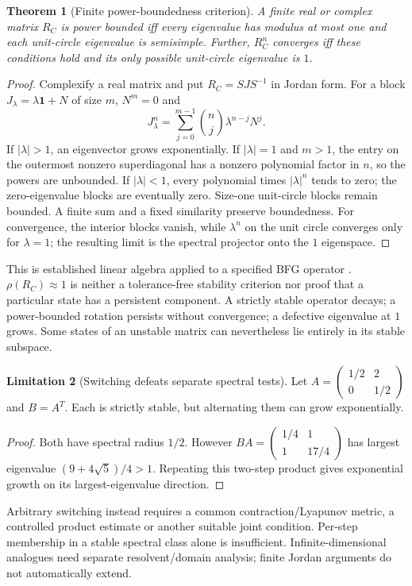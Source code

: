 \documentclass[11pt,letterpaper]{article}
\newcommand{\Id}{\mathbf 1}
\newtheorem{theorem}{Theorem}[section]
\theoremstyle{definition}
\newtheorem{limitation}[theorem]{Limitation}
\numberwithin{equation}{section}
\begin{document}
\begin{theorem}[Finite power-boundedness criterion]\label{spectral}
A finite real or complex matrix $R_C$ is power bounded iff every eigenvalue has modulus at most one and each unit-circle eigenvalue is semisimple. Further, $R_C^n$ converges iff these conditions hold and its only possible unit-circle eigenvalue is $1$.
\end{theorem}
\begin{proof}
Complexify a real matrix and put $R_C=SJS^{-1}$ in Jordan form. For a block $J_\lambda=\lambda\Id+N$ of size $m$, $N^m=0$ and
\begin{equation}
J_\lambda^n=\sum_{j=0}^{m-1}\binom nj\lambda^{n-j}N^j.
\end{equation}
If $|\lambda|>1$, an eigenvector grows exponentially. If $|\lambda|=1$ and $m>1$, the entry on the outermost nonzero superdiagonal has a nonzero polynomial factor in $n$, so the powers are unbounded. If $|\lambda|<1$, every polynomial times $|\lambda|^n$ tends to zero; the zero-eigenvalue blocks are eventually zero. Size-one unit-circle blocks remain bounded. A finite sum and a fixed similarity preserve boundedness. For convergence, the interior blocks vanish, while $\lambda^n$ on the unit circle converges only for $\lambda=1$; the resulting limit is the spectral projector onto the $1$ eigenspace.
\end{proof}
This is established linear algebra applied to a specified BFG operator \cite{horn}. $\rho(R_C)\approx1$ is neither a tolerance-free stability criterion nor proof that a particular state has a persistent component. A strictly stable operator decays; a power-bounded rotation persists without convergence; a defective eigenvalue at $1$ grows. Some states of an unstable matrix can nevertheless lie entirely in its stable subspace.

\begin{limitation}[Switching defeats separate spectral tests]\label{switch}
Let $A=\left(\begin{smallmatrix}1/2&2\\0&1/2\end{smallmatrix}\right)$ and $B=A^T$. Each is strictly stable, but alternating them can grow exponentially.
\end{limitation}
\begin{proof}
Both have spectral radius $1/2$. However $BA=\left(\begin{smallmatrix}1/4&1\\1&17/4\end{smallmatrix}\right)$ has largest eigenvalue $(9+4\sqrt5)/4>1$. Repeating this two-step product gives exponential growth on its largest-eigenvalue direction.
\end{proof}
Arbitrary switching instead requires a common contraction/Lyapunov metric, a controlled product estimate or another suitable joint condition. Per-step membership in a stable spectral class alone is insufficient. Infinite-dimensional analogues need separate resolvent/domain analysis; finite Jordan arguments do not automatically extend.
\end{document}
